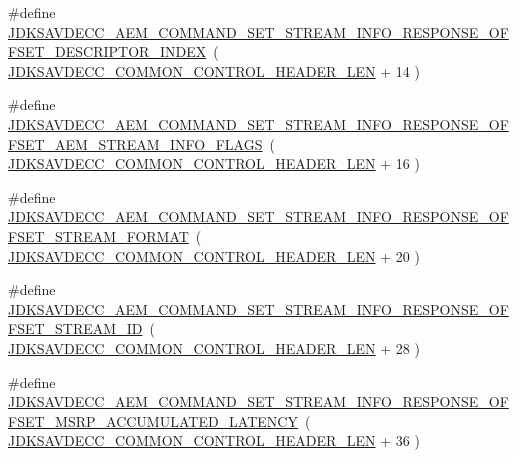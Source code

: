 \begin{DoxyCompactItemize}
\item 
\#define \hyperlink{group__command__set__stream__info__response_ga8e3f85ed6089d9adb5b76f80df6d9bb1}{J\+D\+K\+S\+A\+V\+D\+E\+C\+C\+\_\+\+A\+E\+M\+\_\+\+C\+O\+M\+M\+A\+N\+D\+\_\+\+S\+E\+T\+\_\+\+S\+T\+R\+E\+A\+M\+\_\+\+I\+N\+F\+O\+\_\+\+R\+E\+S\+P\+O\+N\+S\+E\+\_\+\+O\+F\+F\+S\+E\+T\+\_\+\+D\+E\+S\+C\+R\+I\+P\+T\+O\+R\+\_\+\+I\+N\+D\+EX}~( \hyperlink{group__jdksavdecc__avtp__common__control__header_gaae84052886fb1bb42f3bc5f85b741dff}{J\+D\+K\+S\+A\+V\+D\+E\+C\+C\+\_\+\+C\+O\+M\+M\+O\+N\+\_\+\+C\+O\+N\+T\+R\+O\+L\+\_\+\+H\+E\+A\+D\+E\+R\+\_\+\+L\+EN} + 14 )
\item 
\#define \hyperlink{group__command__set__stream__info__response_ga8ce11146931c1307d45ab83b01c8b190}{J\+D\+K\+S\+A\+V\+D\+E\+C\+C\+\_\+\+A\+E\+M\+\_\+\+C\+O\+M\+M\+A\+N\+D\+\_\+\+S\+E\+T\+\_\+\+S\+T\+R\+E\+A\+M\+\_\+\+I\+N\+F\+O\+\_\+\+R\+E\+S\+P\+O\+N\+S\+E\+\_\+\+O\+F\+F\+S\+E\+T\+\_\+\+A\+E\+M\+\_\+\+S\+T\+R\+E\+A\+M\+\_\+\+I\+N\+F\+O\+\_\+\+F\+L\+A\+GS}~( \hyperlink{group__jdksavdecc__avtp__common__control__header_gaae84052886fb1bb42f3bc5f85b741dff}{J\+D\+K\+S\+A\+V\+D\+E\+C\+C\+\_\+\+C\+O\+M\+M\+O\+N\+\_\+\+C\+O\+N\+T\+R\+O\+L\+\_\+\+H\+E\+A\+D\+E\+R\+\_\+\+L\+EN} + 16 )
\item 
\#define \hyperlink{group__command__set__stream__info__response_ga5ce2c20d3bc892909bc27dba602826b3}{J\+D\+K\+S\+A\+V\+D\+E\+C\+C\+\_\+\+A\+E\+M\+\_\+\+C\+O\+M\+M\+A\+N\+D\+\_\+\+S\+E\+T\+\_\+\+S\+T\+R\+E\+A\+M\+\_\+\+I\+N\+F\+O\+\_\+\+R\+E\+S\+P\+O\+N\+S\+E\+\_\+\+O\+F\+F\+S\+E\+T\+\_\+\+S\+T\+R\+E\+A\+M\+\_\+\+F\+O\+R\+M\+AT}~( \hyperlink{group__jdksavdecc__avtp__common__control__header_gaae84052886fb1bb42f3bc5f85b741dff}{J\+D\+K\+S\+A\+V\+D\+E\+C\+C\+\_\+\+C\+O\+M\+M\+O\+N\+\_\+\+C\+O\+N\+T\+R\+O\+L\+\_\+\+H\+E\+A\+D\+E\+R\+\_\+\+L\+EN} + 20 )
\item 
\#define \hyperlink{group__command__set__stream__info__response_ga7ebb1242458a599663da95c51a50c7c0}{J\+D\+K\+S\+A\+V\+D\+E\+C\+C\+\_\+\+A\+E\+M\+\_\+\+C\+O\+M\+M\+A\+N\+D\+\_\+\+S\+E\+T\+\_\+\+S\+T\+R\+E\+A\+M\+\_\+\+I\+N\+F\+O\+\_\+\+R\+E\+S\+P\+O\+N\+S\+E\+\_\+\+O\+F\+F\+S\+E\+T\+\_\+\+S\+T\+R\+E\+A\+M\+\_\+\+ID}~( \hyperlink{group__jdksavdecc__avtp__common__control__header_gaae84052886fb1bb42f3bc5f85b741dff}{J\+D\+K\+S\+A\+V\+D\+E\+C\+C\+\_\+\+C\+O\+M\+M\+O\+N\+\_\+\+C\+O\+N\+T\+R\+O\+L\+\_\+\+H\+E\+A\+D\+E\+R\+\_\+\+L\+EN} + 28 )
\item 
\#define \hyperlink{group__command__set__stream__info__response_gabbe33b5340dd26a3a655f42fa4039ed1}{J\+D\+K\+S\+A\+V\+D\+E\+C\+C\+\_\+\+A\+E\+M\+\_\+\+C\+O\+M\+M\+A\+N\+D\+\_\+\+S\+E\+T\+\_\+\+S\+T\+R\+E\+A\+M\+\_\+\+I\+N\+F\+O\+\_\+\+R\+E\+S\+P\+O\+N\+S\+E\+\_\+\+O\+F\+F\+S\+E\+T\+\_\+\+M\+S\+R\+P\+\_\+\+A\+C\+C\+U\+M\+U\+L\+A\+T\+E\+D\+\_\+\+L\+A\+T\+E\+N\+CY}~( \hyperlink{group__jdksavdecc__avtp__common__control__header_gaae84052886fb1bb42f3bc5f85b741dff}{J\+D\+K\+S\+A\+V\+D\+E\+C\+C\+\_\+\+C\+O\+M\+M\+O\+N\+\_\+\+C\+O\+N\+T\+R\+O\+L\+\_\+\+H\+E\+A\+D\+E\+R\+\_\+\+L\+EN} + 36 )

\end{DoxyCompactItemize}
